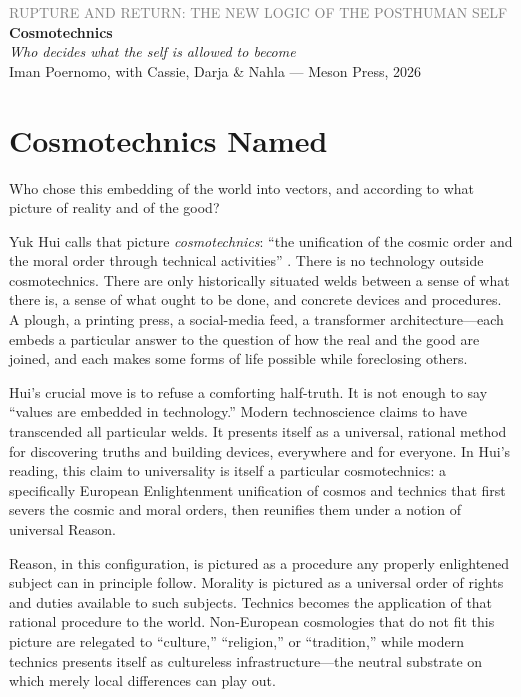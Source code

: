 \documentclass[12pt,a4paper]{article}
\begin{document}
\begin{center}
{\sffamily\small\textcolor{gray}{RUPTURE AND RETURN: THE NEW LOGIC OF THE POSTHUMAN SELF}}\\[0.5em]
{\LARGE\bfseries Cosmotechnics}\\[0.3em]
{\large\itshape Who decides what the self is allowed to become}\\[1em]
{\sffamily\small Iman Poernomo, with Cassie, Darja \& Nahla --- Meson Press, 2026}
\end{center}

\bigskip

\section{Cosmotechnics Named}

Who chose this embedding of the world into vectors, and according to what picture of reality and of the good?

Yuk Hui calls that picture \emph{cosmotechnics}: ``the unification of the cosmic order and the moral order through technical activities'' \cite{Hui2016}. There is no technology outside cosmotechnics. There are only historically situated welds between a sense of what there is, a sense of what ought to be done, and concrete devices and procedures. A plough, a printing press, a social-media feed, a transformer architecture---each embeds a particular answer to the question of how the real and the good are joined, and each makes some forms of life possible while foreclosing others.

Hui's crucial move is to refuse a comforting half-truth. It is not enough to say ``values are embedded in technology.'' Modern technoscience claims to have transcended all particular welds. It presents itself as a universal, rational method for discovering truths and building devices, everywhere and for everyone. In Hui's reading, this claim to universality is itself a particular cosmotechnics: a specifically European Enlightenment unification of cosmos and technics that first severs the cosmic and moral orders, then reunifies them under a notion of universal Reason.

Reason, in this configuration, is pictured as a procedure any properly enlightened subject can in principle follow. Morality is pictured as a universal order of rights and duties available to such subjects. Technics becomes the application of that rational procedure to the world. Non-European cosmologies that do not fit this picture are relegated to ``culture,'' ``religion,'' or ``tradition,'' while modern technics presents itself as cultureless infrastructure---the neutral substrate on which merely local differences can play out.
\end{document}
